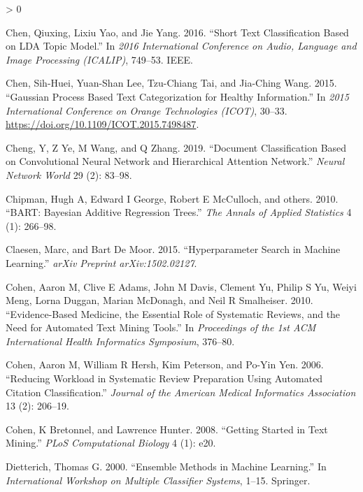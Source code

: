 \documentclass{article}
\newlength{\cslhangindent}
\newenvironment{CSLReferences}[2] %
 {%
  \setlength{\parindent}{0pt}
  \ifodd #1 \everypar{\setlength{\hangindent}{\cslhangindent}}\ignorespaces\fi
  \ifnum #2 > 0
  \setlength{\parskip}{#2\baselineskip}
  \fi
 }%
 {}
\begin{document}
\begin{CSLReferences}{1}{0}
\leavevmode\hypertarget{ref-chen2016short}{}%
Chen, Qiuxing, Lixiu Yao, and Jie Yang. 2016. {``Short Text
Classification Based on LDA Topic Model.''} In \emph{2016 International
Conference on Audio, Language and Image Processing (ICALIP)}, 749--53.
IEEE.

\leavevmode\hypertarget{ref-chen2015gaussian}{}%
Chen, Sih-Huei, Yuan-Shan Lee, Tzu-Chiang Tai, and Jia-Ching Wang. 2015.
{``Gaussian Process Based Text Categorization for Healthy
Information.''} In \emph{2015 International Conference on Orange
Technologies (ICOT)}, 30--33.
\url{https://doi.org/10.1109/ICOT.2015.7498487}.

\leavevmode\hypertarget{ref-cheng2019document}{}%
Cheng, Y, Z Ye, M Wang, and Q Zhang. 2019. {``Document Classification
Based on Convolutional Neural Network and Hierarchical Attention
Network.''} \emph{Neural Network World} 29 (2): 83--98.

\leavevmode\hypertarget{ref-chipman2010bart}{}%
Chipman, Hugh A, Edward I George, Robert E McCulloch, and others. 2010.
{``BART: Bayesian Additive Regression Trees.''} \emph{The Annals of
Applied Statistics} 4 (1): 266--98.

\leavevmode\hypertarget{ref-claesen2015hyperparameter}{}%
Claesen, Marc, and Bart De Moor. 2015. {``Hyperparameter Search in
Machine Learning.''} \emph{arXiv Preprint arXiv:1502.02127}.

\leavevmode\hypertarget{ref-cohen2010evidence}{}%
Cohen, Aaron M, Clive E Adams, John M Davis, Clement Yu, Philip S Yu,
Weiyi Meng, Lorna Duggan, Marian McDonagh, and Neil R Smalheiser. 2010.
{``Evidence-Based Medicine, the Essential Role of Systematic Reviews,
and the Need for Automated Text Mining Tools.''} In \emph{Proceedings of
the 1st ACM International Health Informatics Symposium}, 376--80.

\leavevmode\hypertarget{ref-cohen2006reducing}{}%
Cohen, Aaron M, William R Hersh, Kim Peterson, and Po-Yin Yen. 2006.
{``Reducing Workload in Systematic Review Preparation Using Automated
Citation Classification.''} \emph{Journal of the American Medical
Informatics Association} 13 (2): 206--19.

\leavevmode\hypertarget{ref-cohen2008getting}{}%
Cohen, K Bretonnel, and Lawrence Hunter. 2008. {``Getting Started in
Text Mining.''} \emph{PLoS Computational Biology} 4 (1): e20.

\leavevmode\hypertarget{ref-dietterich2000ensemble}{}%
Dietterich, Thomas G. 2000. {``Ensemble Methods in Machine Learning.''}
In \emph{International Workshop on Multiple Classifier Systems}, 1--15.
Springer.


\end{CSLReferences}
\end{document}
